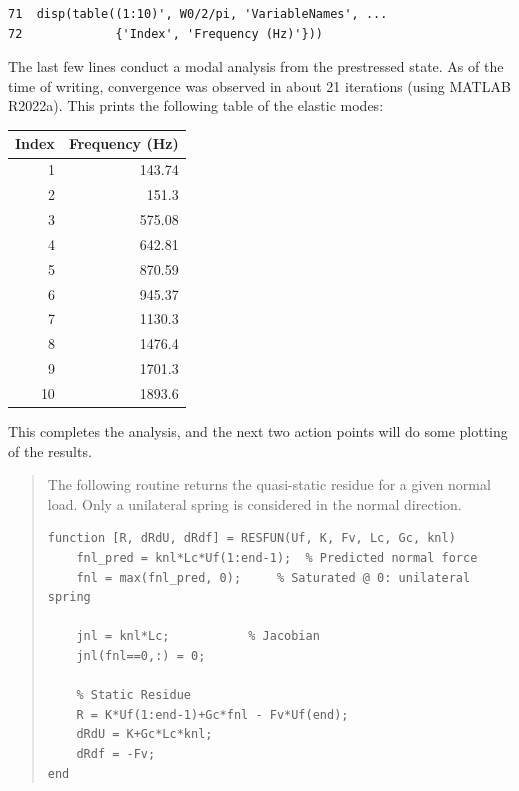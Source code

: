 \documentclass[11pt]{article}
\begin{document}
\begin{enumerate}
\begin{verbatim}
71  disp(table((1:10)', W0/2/pi, 'VariableNames', ...
72             {'Index', 'Frequency (Hz)'}))
\end{verbatim}
The last few lines conduct a modal analysis from the prestressed state.
As of the time of writing, convergence was observed in about 21 iterations (using MATLAB R2022a).
This prints the following table of the elastic modes:
\begin{center}
\begin{tabular}{rr}
Index & Frequency (Hz)\\[0pt]
\hline
1 & 143.74\\[0pt]
2 & 151.3\\[0pt]
3 & 575.08\\[0pt]
4 & 642.81\\[0pt]
5 & 870.59\\[0pt]
6 & 945.37\\[0pt]
7 & 1130.3\\[0pt]
8 & 1476.4\\[0pt]
9 & 1701.3\\[0pt]
10 & 1893.6\\[0pt]
\end{tabular}
\end{center}
\end{enumerate}
This completes the analysis, and the next two action points will do some plotting of the results.

\begin{quote}
                              \begin{tcolorbox}[colback=osbe-bg,colframe=osbe-fg,title={Static Residue Routine RESFUN.m},sharp corners,boxrule=0.4pt]
The following routine returns the quasi-static residue for a given normal load.
Only a unilateral spring is considered in the normal direction.
\begin{verbatim}
function [R, dRdU, dRdf] = RESFUN(Uf, K, Fv, Lc, Gc, knl)
    fnl_pred = knl*Lc*Uf(1:end-1);	% Predicted normal force
    fnl = max(fnl_pred, 0);		% Saturated @ 0: unilateral spring

    jnl = knl*Lc;			% Jacobian
    jnl(fnl==0,:) = 0;			

    % Static Residue
    R = K*Uf(1:end-1)+Gc*fnl - Fv*Uf(end);
    dRdU = K+Gc*Lc*knl;
    dRdf = -Fv;
end
\end{verbatim}


               \end{tcolorbox}
\end{quote}
\end{document}
